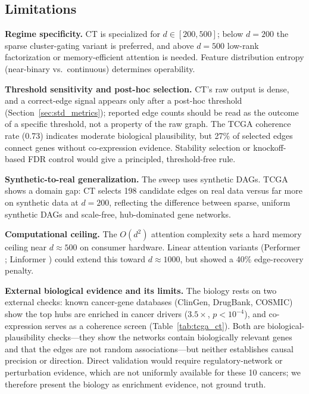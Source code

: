 \documentclass[12pt,a4paper]{article}
\begin{document}
\subsection{Limitations}\label{sec:limitations}

\textbf{Regime specificity.} CT is specialized for $d \in [200, 500]$; below $d=200$ the sparse cluster-gating variant is preferred, and above $d=500$ low-rank factorization or memory-efficient attention is needed. Feature distribution entropy (near-binary vs.\ continuous) determines operability.

\textbf{Threshold sensitivity and post-hoc selection.} CT's raw output is dense, and a correct-edge signal appears only after a post-hoc threshold (Section~\ref{sec:std_metrics}); reported edge counts should be read as the outcome of a specific threshold, not a property of the raw graph. The TCGA coherence rate (0.73) indicates moderate biological plausibility, but 27\% of selected edges connect genes without co-expression evidence. Stability selection \cite{meinshausen2010stability} or knockoff-based FDR control \cite{barber2015controlling} would give a principled, threshold-free rule.

\textbf{Synthetic-to-real generalization.} The sweep uses synthetic DAGs. TCGA shows a domain gap: CT selects 198 candidate edges on real data versus far more on synthetic data at $d=200$, reflecting the difference between sparse, uniform synthetic DAGs and scale-free, hub-dominated gene networks.

\textbf{Computational ceiling.} The $O(d^2)$ attention complexity sets a hard memory ceiling near $d\approx500$ on consumer hardware. Linear attention variants (Performer \cite{choromanski2020rethinking}; Linformer \cite{wang2020linformer}) could extend this toward $d\approx1000$, but showed a 40\% edge-recovery penalty.

\textbf{External biological evidence and its limits.} The biology rests on two external checks: known cancer-gene databases (ClinGen, DrugBank, COSMIC) show the top hubs are enriched in cancer drivers ($3.5\times$, $p<10^{-4}$), and co-expression serves as a coherence screen (Table~\ref{tab:tcga_ct}). Both are biological-plausibility checks---they show the networks contain biologically relevant genes and that the edges are not random associations---but neither establishes causal precision or direction. Direct validation would require regulatory-network or perturbation evidence, which are not uniformly available for these 10 cancers; we therefore present the biology as enrichment evidence, not ground truth.
\end{document}
